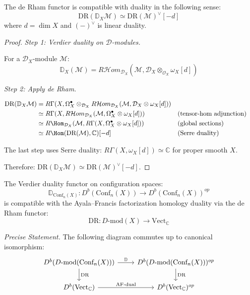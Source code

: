 \begin{proposition}\label{prop:DR-preserves-duality}
The de Rham functor is compatible with duality in the following sense:
\[\text{DR}(\mathbb{D}_X \mathcal{M}) \simeq \text{DR}(\mathcal{M})^\vee[-d]\]
where $d = \dim X$ and $(-)^\vee$ is linear duality.
\end{proposition}

\begin{proof}
\emph{Step 1: Verdier duality on $\mathcal{D}$-modules.}

For a $\mathcal{D}_X$-module $\mathcal{M}$:
\[\mathbb{D}_X(\mathcal{M}) = R\mathcal{H}om_{\mathcal{D}_X}(\mathcal{M}, \mathcal{D}_X \otimes_{\mathcal{O}_X} \omega_X[d])\]

\emph{Step 2: Apply de Rham.}

\begin{align*}
\text{DR}(\mathbb{D}_X \mathcal{M}) 
&= R\Gamma(X, \Omega^\bullet_X \otimes_{\mathcal{D}_X} R\mathcal{H}om_{\mathcal{D}_X}(\mathcal{M}, \mathcal{D}_X \otimes \omega_X[d])) \\
&\simeq R\Gamma(X, R\mathcal{H}om_{\mathcal{D}_X}(\mathcal{M}, \Omega^\bullet_X \otimes \omega_X[d])) && \text{(tensor-hom adjunction)} \\
&\simeq R\Hom_{\mathcal{D}_X}(\mathcal{M}, R\Gamma(X, \Omega^\bullet_X \otimes \omega_X[d])) && \text{(global sections)} \\
&\simeq R\Hom(\text{DR}(\mathcal{M}), \mathbb{C})[-d] && \text{(Serre duality)}
\end{align*}

The last step uses Serre duality: $R\Gamma(X, \omega_X[d]) \simeq \mathbb{C}$ for proper smooth $X$.

Therefore: $\text{DR}(\mathbb{D}_X \mathcal{M}) \simeq \text{DR}(\mathcal{M})^\vee[-d]$. \qedhere
\end{proof}

\begin{theorem}\label{thm:verdier-AF-compat}
The Verdier duality functor on configuration spaces:
\[\mathbb{D}_{\text{Conf}_n(X)}: D^b(\text{Conf}_n(X)) \to D^b(\text{Conf}_n(X))^{op}\]
is compatible with the Ayala--Francis factorization homology duality via the de Rham functor:
\[\text{DR}: D\text{-mod}(X) \to \text{Vect}_\mathbb{C}\]

\emph{Precise Statement.} The following diagram commutes up to canonical isomorphism:
\[
\begin{tikzcd}
D^b(D\text{-mod}(\text{Conf}_n(X))) \arrow[r, "\mathbb{D}"] \arrow[d, "\text{DR}"] 
& D^b(D\text{-mod}(\text{Conf}_n(X)))^{op} \arrow[d, "\text{DR}"] \\
D^b(\text{Vect}_\mathbb{C}) \arrow[r, "\text{AF-dual}"] & D^b(\text{Vect}_\mathbb{C})^{op}
\end{tikzcd}
\]
\end{theorem}

